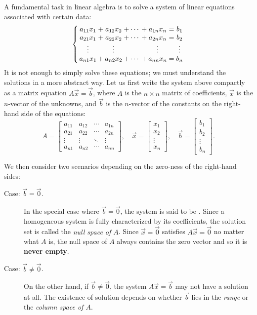 \documentclass{ximera}
\begin{document}
A fundamental task in linear algebra is to solve a system of linear
equations associated with certain data:
\begin{equation*}
  \left\{ \,
    \begin{array}{*{9}{@{}c@{}}}
      a_{11} x_1 & {}+{} & a_{12} x_2 & {}+{} & \cdots & {}+{} & a_{1n} x_n & {}\mathrel{=}{} & b_1 \\
      a_{21} x_1 & {}+{} & a_{22} x_2 & {}+{} & \cdots & {}+{} & a_{2n} x_n & {}\mathrel{=}{} & b_2 \\
      \vdots         &       & \vdots         &      &   &       & \vdots         &                 & \vdots \\
      a_{n1} x_1 & {}+{} & a_{n2} x_2 & {}+{} & \cdots & {}+{} & a_{nn} x_n & {}\mathrel{=}{} & b_n
    \end{array}
    \, \right.
\end{equation*}
It is not enough to simply solve these equations; we must understand
the solutions in a more abstract way. Let us first write the system
above compactly as a matrix equation $A \vec{x} = \vec{b}$, where $A$
is the $n \times n$ matrix of coefficients, $\vec{x}$ is the
$n$-vector of the unknowns, and $\vec{b}$ is the $n$-vector of the constants on the
right-hand side of the equations:
\[
  A =
  \begin{bmatrix}
    a_{11} & a_{12} & \cdots & a_{1n} \\
    a_{21} & a_{22} & \cdots & a_{2n} \\
    \vdots & \vdots & \ddots & \vdots \\
    a_{n1} & a_{n2} & \cdots & a_{nn}
  \end{bmatrix}, \quad
  \vec{x} =
  \begin{bmatrix}
    x_1 \\ x_2 \\ \vdots \\ x_n
  \end{bmatrix}, \quad
  \vec{b} =
  \begin{bmatrix}
    b_1 \\ b_2 \\ \vdots \\ b_n
  \end{bmatrix}.
\]

We then consider two scenarios depending on the zero-ness of the right-hand
sides:
\begin{description}
\item[Case: $\vec{b} = \vec{0}$.] In the special case where $\vec{b} = \vec{0}$,
  the system is said to be . Since a homogeneous system is
  fully characterized by its coefficients, the solution set is called the
  \textit{null space of $A$}. Since $\vec{x} = \vec{0}$ satisfies $A\vec{x} =
  \vec{0}$ no matter what $A$ is, the null space of $A$ always contains the zero
  vector and so it is \textbf{never empty}.
\item[Case: $\vec{b} \neq \vec{0}$.] On the other hand, if $\vec{b} \neq
  \vec{0}$, the system $A\vec{x} = \vec{b}$ may not have a solution at all. The
  existence of solution depends on whether $\vec{b}$ lies in the \textit{range}
  or the \textit{column space of $A$}.
\end{description}
\end{document}
